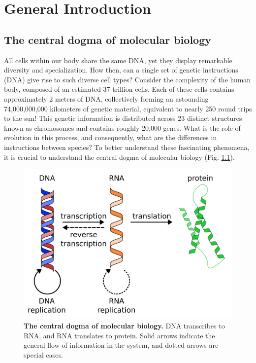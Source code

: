 \chapter{General Introduction}\thumbforchapter
\newpage

\section{The central dogma of molecular biology}

All cells within our body share the same DNA, yet they display remarkable diversity and specialization. How then, can a single set of genetic instructions (DNA) give rise to such diverse cell types? Consider the complexity of the human body, composed of an estimated 37 trillion cells\cite{Bianconi2013,Sender2016}. Each of these cells contains approximately 2 meters of DNA, collectively forming an astounding 74,000,000,000 kilometers of genetic material, equivalent to nearly 250 round trips to the sun! This genetic information is distributed across 23 distinct structures known as chromosomes and contains roughly 20,000 genes. What is the role of evolution in this process, and consequently, what are the differences in instructions between species? To better understand these fascinating phenomena, it is crucial to understand the central dogma of molecular biology (Fig. \ref{fig:central_dogma})\cite{Cobb2017}.

\begin{figure}[H]
    \center
    \includegraphics[width=0.7\linewidth]{ch.introduction/imgs/central_dogma.png}
    \caption{\textbf{The central dogma of molecular biology.} DNA transcribes to RNA, and RNA translates to protein. Solid arrows indicate the general flow of information in the system, and dotted arrows are special cases.}
    \label{fig:central_dogma}
\end{figure}

